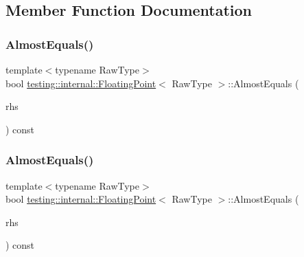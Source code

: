 \subsection{Member Function Documentation}
\mbox{\label{classtesting_1_1internal_1_1_floating_point_a965214c1af2f9ac5adb1393794aa81e5}} 
\subsubsection{\texorpdfstring{AlmostEquals()}{AlmostEquals()}\hspace{0.1cm}{\footnotesize\ttfamily [1/3]}}
{\footnotesize\ttfamily template$<$typename Raw\+Type$>$ \\
bool \mbox{\hyperlink{classtesting_1_1internal_1_1_floating_point}{testing\+::internal\+::\+Floating\+Point}}$<$ Raw\+Type $>$\+::Almost\+Equals (\begin{DoxyParamCaption}\item[{const \mbox{\hyperlink{classtesting_1_1internal_1_1_floating_point}{Floating\+Point}}$<$ Raw\+Type $>$ \&}]{rhs }\end{DoxyParamCaption}) const\hspace{0.3cm}{\ttfamily [inline]}}

\mbox{\label{classtesting_1_1internal_1_1_floating_point_a965214c1af2f9ac5adb1393794aa81e5}} 
\subsubsection{\texorpdfstring{AlmostEquals()}{AlmostEquals()}\hspace{0.1cm}{\footnotesize\ttfamily [2/3]}}
{\footnotesize\ttfamily template$<$typename Raw\+Type$>$ \\
bool \mbox{\hyperlink{classtesting_1_1internal_1_1_floating_point}{testing\+::internal\+::\+Floating\+Point}}$<$ Raw\+Type $>$\+::Almost\+Equals (\begin{DoxyParamCaption}\item[{const \mbox{\hyperlink{classtesting_1_1internal_1_1_floating_point}{Floating\+Point}}$<$ Raw\+Type $>$ \&}]{rhs }\end{DoxyParamCaption}) const\hspace{0.3cm}{\ttfamily [inline]}}

